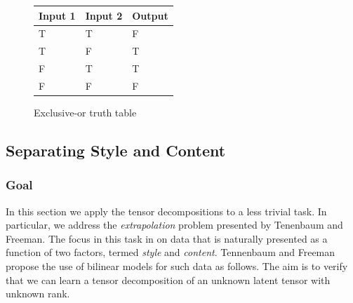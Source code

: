 \begin{figure}
\begin{floatrow}
  {%
   \begin{tabu} to 0.3\textwidth {|X|X||X|}
	\hline
	Input 1 & Input 2 & Output \\
	\hline\hline
	T & T & F \\
	T & F & T \\
	F & T & T \\
	F & F & F \\
	\hline
	\end{tabu}%
  }
  {%
   \caption{Exclusive-or truth table}
   \label{tab:xor}%
  }
\end{floatrow}
\end{figure}

\subsection{Separating Style and Content}
\subsubsection{Goal}
In this section we apply the tensor decompositions to a less trivial task. In particular, we
address the \textit{extrapolation} problem presented by Tenenbaum and 
Freeman. \autocite{Tenenbaum2000} The focus in this task in on data that is naturally presented as a
function of two factors, termed \textit{style} and \textit{content}. Tennenbaum and Freeman
propose the use of bilinear models for such data as follows. The aim is to verify that we
can learn a tensor decomposition of an unknown latent tensor with unknown rank.

